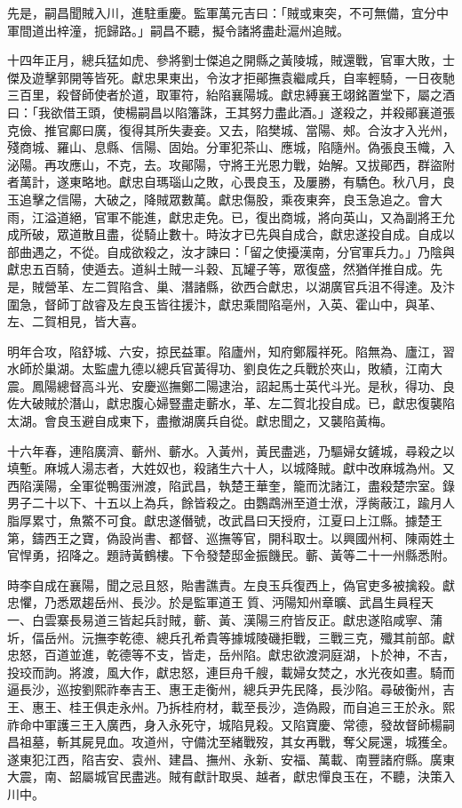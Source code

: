 \begin{pinyinscope}
先是，嗣昌聞賊入川，進駐重慶。監軍萬元吉曰：「賊或東突，不可無備，宜分中軍間道出梓潼，扼歸路。」嗣昌不聽，擬令諸將盡赴滬州追賊。

十四年正月，總兵猛如虎、參將劉士傑追之開縣之黃陵城，賊還戰，官軍大敗，士傑及遊擊郭開等皆死。獻忠果東出，令汝才拒鄖撫袁繼咸兵，自率輕騎，一日夜馳三百里，殺督師使者於道，取軍符，紿陷襄陽城。獻忠縛襄王翊銘置堂下，屬之酒曰：「我欲借王頭，使楊嗣昌以陷籓誅，王其努力盡此酒。」遂殺之，并殺鄖襄道張克儉、推官鄺曰廣，復得其所失妻妾。又去，陷樊城、當陽、郟。合汝才入光州，殘商城、羅山、息縣、信陽、固始。分軍犯茶山、應城，陷隨州。偽張良玉幟，入泌陽。再攻應山，不克，去。攻鄖陽，守將王光恩力戰，始解。又拔鄖西，群盜附者萬計，遂東略地。獻忠自瑪瑙山之敗，心畏良玉，及屢勝，有驕色。秋八月，良玉追擊之信陽，大破之，降賊眾數萬。獻忠傷股，乘夜東奔，良玉急追之。會大雨，江溢道絕，官軍不能進，獻忠走免。已，復出商城，將向英山，又為副將王允成所破，眾道散且盡，從騎止數十。時汝才已先與自成合，獻忠遂投自成。自成以部曲遇之，不從。自成欲殺之，汝才諫曰：「留之使擾漢南，分官軍兵力。」乃陰與獻忠五百騎，使遁去。道糾土賊一斗穀、瓦罐子等，眾復盛，然猶佯推自成。先是，賊營革、左二賀陷含、巢、潛諸縣，欲西合獻忠，以湖廣官兵沮不得達。及汴圍急，督師丁啟睿及左良玉皆往援汴，獻忠乘間陷亳州，入英、霍山中，與革、左、二賀相見，皆大喜。

明年合攻，陷舒城、六安，掠民益軍。陷廬州，知府鄭履祥死。陷無為、廬江，習水師於巢湖。太監盧九德以總兵官黃得功、劉良佐之兵戰於夾山，敗績，江南大震。鳳陽總督高斗光、安慶巡撫鄭二陽逮治，詔起馬士英代斗光。是秋，得功、良佐大破賊於潛山，獻忠腹心婦豎盡走蘄水，革、左二賀北投自成。已，獻忠復襲陷太湖。會良玉避自成東下，盡撤湖廣兵自從。獻忠聞之，又襲陷黃梅。

十六年春，連陷廣濟、蘄州、蘄水。入黃州，黃民盡逃，乃驅婦女鏟城，尋殺之以填塹。麻城人湯志者，大姓奴也，殺諸生六十人，以城降賊。獻中改麻城為州。又西陷漢陽，全軍從鴨蛋洲渡，陷武昌，執楚王華奎，籠而沈諸江，盡殺楚宗室。錄男子二十以下、十五以上為兵，餘皆殺之。由鸚鵡洲至道士洑，浮胔蔽江，踰月人脂厚累寸，魚鱉不可食。獻忠遂僭號，改武昌曰天授府，江夏曰上江縣。據楚王第，鑄西王之寶，偽設尚書、都督、巡撫等官，開科取士。以興國州柯、陳兩姓土官悍勇，招降之。題詩黃鶴樓。下令發楚邸金振饑民。蘄、黃等二十一州縣悉附。

時李自成在襄陽，聞之忌且怒，貽書譙責。左良玉兵復西上，偽官吏多被擒殺。獻忠懼，乃悉眾趨岳州、長沙。於是監軍道王質、沔陽知州章曠、武昌生員程天一、白雲寨長易道三皆起兵討賊，蘄、黃、漢陽三府皆反正。獻忠遂陷咸寧、蒲圻，偪岳州。沅撫李乾德、總兵孔希貴等據城陵磯拒戰，三戰三克，殲其前部。獻忠怒，百道並進，乾德等不支，皆走，岳州陷。獻忠欲渡洞庭湖，卜於神，不吉，投珓而訽。將渡，風大作，獻忠怒，連巨舟千艘，載婦女焚之，水光夜如晝。騎而逼長沙，巡按劉熙祚奉吉王、惠王走衡州，總兵尹先民降，長沙陷。尋破衡州，吉王、惠王、桂王俱走永州。乃拆桂府材，載至長沙，造偽殿，而自追三王於永。熙祚命中軍護三王入廣西，身入永死守，城陷見殺。又陷寶慶、常德，發故督師楊嗣昌祖墓，斬其屍見血。攻道州，守備沈至緒戰歿，其女再戰，奪父屍還，城獲全。遂東犯江西，陷吉安、袁州、建昌、撫州、永新、安福、萬載、南豐諸府縣。廣東大震，南、韶屬城官民盡逃。賊有獻計取吳、越者，獻忠憚良玉在，不聽，決策入川中。


\end{pinyinscope}
